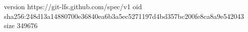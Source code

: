 version https://git-lfs.github.com/spec/v1
oid sha256:248d13a14880700e36840ea6b3a5ec5271197d4bd357bc200fe8ca8a9e542043
size 349676
